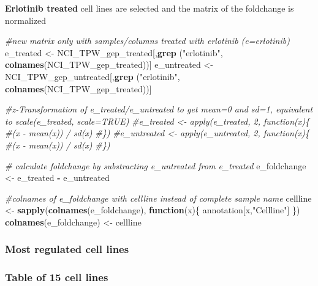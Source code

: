 \documentclass[]{article}
\newenvironment{Shaded}{\begin{snugshade}}{\end{snugshade}}
\newcommand{\CommentTok}[1]{\textcolor[rgb]{0.56,0.35,0.01}{\textit{#1}}}
\newcommand{\ControlFlowTok}[1]{\textcolor[rgb]{0.13,0.29,0.53}{\textbf{#1}}}
\newcommand{\KeywordTok}[1]{\textcolor[rgb]{0.13,0.29,0.53}{\textbf{#1}}}
\newcommand{\NormalTok}[1]{#1}
\newcommand{\OperatorTok}[1]{\textcolor[rgb]{0.81,0.36,0.00}{\textbf{#1}}}
\newcommand{\StringTok}[1]{\textcolor[rgb]{0.31,0.60,0.02}{#1}}
\begin{document}
\textbf{Erlotinib treated} cell lines are selected and the matrix of the
foldchange is normalized

\begin{Shaded}
\begin{Highlighting}[]
\CommentTok{#new matrix only with samples/columns treated with erlotinib  (e=erlotinib)}
\NormalTok{e_treated <-}\StringTok{ }\NormalTok{NCI_TPW_gep_treated[,}\KeywordTok{grep}\NormalTok{ (}\StringTok{"erlotinib"}\NormalTok{, }\KeywordTok{colnames}\NormalTok{(NCI_TPW_gep_treated))]}
\NormalTok{e_untreated <-}\StringTok{ }\NormalTok{NCI_TPW_gep_untreated[,}\KeywordTok{grep}\NormalTok{ (}\StringTok{"erlotinib"}\NormalTok{, }\KeywordTok{colnames}\NormalTok{(NCI_TPW_gep_treated))]}

\CommentTok{#z-Transformation of e_treated/e_untreated to get mean=0 and sd=1, equivalent to scale(e_treated, scale=TRUE)}
\CommentTok{#e_treated <- apply(e_treated, 2, function(x)\{}
  \CommentTok{#(x - mean(x)) / sd(x)}
\CommentTok{#\})}
\CommentTok{#e_untreated <- apply(e_untreated, 2, function(x)\{}
  \CommentTok{#(x - mean(x)) / sd(x)}
\CommentTok{#\})}

\CommentTok{# calculate foldchange by substracting e_untreated from e_treated}
\NormalTok{e_foldchange <-}\StringTok{ }\NormalTok{e_treated }\OperatorTok{-}\StringTok{ }\NormalTok{e_untreated}

\CommentTok{#colnames of e_foldchange with cellline instead of complete sample name}
\NormalTok{cellline <-}\StringTok{ }\KeywordTok{sapply}\NormalTok{(}\KeywordTok{colnames}\NormalTok{(e_foldchange), }\ControlFlowTok{function}\NormalTok{(x)\{}
\NormalTok{  annotation[x,}\StringTok{"Cellline"}\NormalTok{]}
\NormalTok{  \}) }
\KeywordTok{colnames}\NormalTok{(e_foldchange) <-}\StringTok{ }\NormalTok{cellline}
\end{Highlighting}
\end{Shaded}

\hypertarget{most-regulated-cell-lines}{%
\subsubsection{\texorpdfstring{\textbf{Most regulated cell
lines}}{Most regulated cell lines}}\label{most-regulated-cell-lines}}

\hypertarget{table-of-15-cell-lines}{%
\subsubsection{Table of 15 cell lines}\label{table-of-15-cell-lines}}
\end{document}
